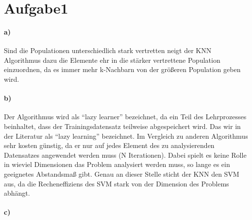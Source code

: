 \section{Aufgabe1}
\label{sec:Aufgabe1}
%
\paragraph{a)} 
Sind die Populationen unterschiedlich stark vertretten neigt der KNN Algorithmus dazu die 
Elemente ehr in die stärker vertrettene Population einzuordnen, da es immer mehr k-Nachbarn von  
der größeren Population geben wird.  
\paragraph{b)} Der Algorithmus wird als \enquote{lazy learner} bezeichnet, da ein Teil des Lehrprozesses 
beinhaltet, dass der Trainingsdatensatz teilweise abgespeichert wird. Das wir in der Literatur als 
\enquote{lazy learning} bezeichnet. Im Vergleich zu anderen Algorithmus sehr kosten günstig, da 
er nur auf jedes Element des zu analysierenden Datensatzes angewendet werden muss (N Iterationen). 
Dabei spielt es keine Rolle in wieviel Dimensionen das Problem analysiert werden muss, 
so lange es ein geeignetes Abstandsmaß gibt. Genau an dieser Stelle sticht der KNN den SVM 
aus, da die Recheneffiziens des SVM stark von der Dimension des Problems abhängt.
\paragraph{c)}\quad \newline

